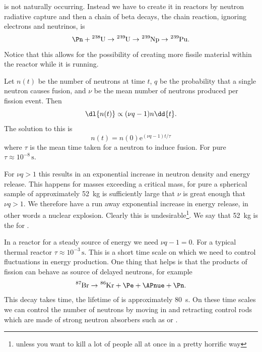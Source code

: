 \documentclass[fleqn]{NotesClass}
\newcommand{\e}{\mathrm{e}}
\begin{document}
     is not naturally occurring.
    Instead we have to create it in reactors by neutron radiative capture and then a chain of beta decays, the chain reaction, ignoring electrons and neutrinos, is
    \begin{equation}
        \Pn + \ce{^238U} \to \ce{^239U} \to \ce{^239Np} \to \ce{^239Pu}.
    \end{equation}
    Notice that this allows for the possibility of creating more fissile material within the reactor while it is running.
    
    Let \(n(t)\) be the number of neutrons at time \(t\), \(q\) be the probability that a single neutron causes fusion, and \(\nu\) be the mean number of neutrons produced per fission event.
    Then
    \begin{equation}
        \dl{n(t)} \propto (\nu q - 1)n\dd{t}.
    \end{equation}
    The solution to this is
    \begin{equation}
        n(t) = n(0)\e^{(\nu q - 1)t/\tau}
    \end{equation}
    where \(\tau\) is the mean time taken for a neutron to induce fusion.
    For pure  \(\tau \approx 10^{-8}\,\unit{\second}\).
    
    For \(\nu q > 1\) this results in an exponential increase in neutron density and energy release.
    This happens for masses exceeding a critical mass, for pure  a spherical sample of approximately \qty{52}{\kilogram} is sufficiently large that \(\nu\) is great enough that \(\nu q > 1\).
    We therefore have a run away exponential increase in energy release, in other words a nuclear explosion.
    Clearly this is undesirable\footnote{unless you want to kill a lot of people all at once in a pretty horrific way}.
    We say that \qty{52}{\kilogram} is the  for .
    
    In a reactor for a steady source of energy we need \(\nu q - 1 = 0\).
    For a typical thermal reactor \(\tau \approx 10^{-3}\,\unit{\second}\).
    This is a short time scale on which we need to control fluctuations in energy production.
    One thing that helps is that the products of fission can behave as source of delayed neutrons, for example
    \begin{equation}
        \ce{^87Br} \to \ce{^86Kr} + \Pe + \APnue + \Pn.
    \end{equation}
    This decay takes time, the lifetime of  is approximately \qty{80}{\second}.
    On these time scales we can control the number of neutrons by moving in and retracting control rods which are made of strong neutron absorbers such as  or .
    
\end{document}
